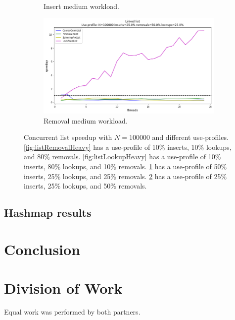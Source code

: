 \documentclass[11pt]{article}
\begin{document}
\begin{figure}[h]
\begin{subfigure}{.6\textwidth}
  \caption{Insert medium workload.}
  \label{fig:listInsertMedium}
\end{subfigure}%
\begin{subfigure}{.6\textwidth}
  \centering
  \includegraphics[width=.8\linewidth]{figs/lateday/combined/lateday_combined_list_insert_25_lookup_25_removal_50}
  \caption{Removal medium workload.}
  \label{fig:listRemovalMedium}
\end{subfigure}
\caption{
Concurrent list speedup with $N=100000$ and different use-profiles.
\ref{fig:listRemovalHeavy} has a use-profile of 10\% inserts, 10\% lookups, and
80\% removals. \ref{fig:listLookupHeavy} has a use-profile of 10\% inserts, 80\%
lookups, and 10\% removals. \ref{fig:listInsertMedium} has a use-profile of 50\%
inserts, 25\% lookups, and 25\% removals. \ref{fig:listRemovalMedium} has a
use-profile of 25\% inserts, 25\% lookups, and 50\% removals.
}
\label{fig:manyLists}
\end{figure}

\subsection{Hashmap results}

\section{Conclusion}

\section{Division of Work}
Equal work was performed by both partners.

\printbibliography
\end{document}
